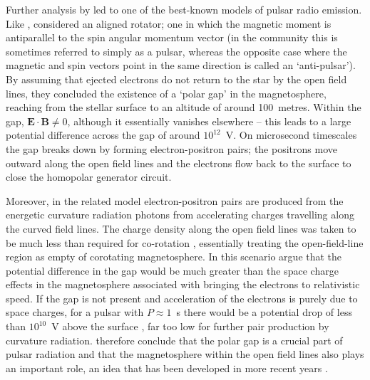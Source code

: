 Further analysis by \citet{RSxx1975} led to one of the best-known models of pulsar radio emission. %
Like \citet{GJxx1969}, \citet{RSxx1975} considered an aligned rotator; one in which the magnetic moment is antiparallel to the spin angular momentum vector (in the community this is sometimes referred to simply as a pulsar, whereas the opposite case where the magnetic and spin vectors point in the same direction is called an `anti-pulsar'). By assuming that ejected electrons do not return to the star by the open field lines, they concluded the existence of a `polar gap' in the magnetosphere, reaching from the stellar surface to an altitude of around 100~metres. Within the gap, $\mathbf{E}\cdot\mathbf{B} \neq 0$, although it essentially vanishes elsewhere -- this leads to a large potential difference across the gap of around $10^{12}$~V. On microsecond timescales the gap breaks down by forming electron-positron pairs; the positrons move outward along the open field lines and the electrons flow back to the surface to close the homopolar generator circuit.

Moreover, in the related \citet{Sxxx1971} model electron-positron pairs are produced from the energetic curvature radiation photons from accelerating charges travelling along the curved field lines. The charge density along the open field lines was taken to be much less than required for co-rotation \citep{GJxx1969}, essentially treating the open-field-line region as empty of corotating magnetosphere. In this scenario \citet{RSxx1975} argue that the potential difference in the gap would be much greater than the space charge effects in the magnetosphere associated with bringing the electrons to relativistic speed. If the gap is not present and acceleration of the electrons is purely due to space charges, for a pulsar with $P\approx1$~s there would be a potential drop of less than $10^{10}$~V above the surface \citep{Mxxx1974}, far too low for further pair production by curvature radiation. \citet{RSxx1975} therefore conclude that the polar gap is a crucial part of pulsar radiation and that the magnetosphere within the open field lines also plays an important role, an idea that has been developed in more recent years \citep[e.g.][]{CRxx1980,ZQHx1997,Txxx2010, SMGx2015}.

